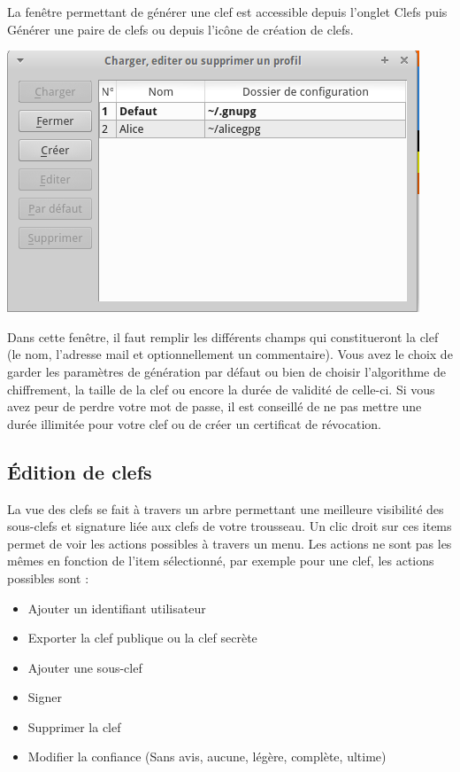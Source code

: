 \documentclass[a4paper,11pt,french]{article}
\begin{document}
La fenêtre permettant de générer une clef est accessible depuis l'onglet Clefs puis Générer une paire de clefs ou depuis l'icône de création de clefs.
\bigbreak

\includegraphics[scale=0.5]{creation.png} \bigbreak


Dans cette fenêtre, il faut remplir les différents champs qui constitueront la clef (le nom, l'adresse mail et optionnellement un commentaire). 
Vous avez le choix de garder les paramètres de génération par défaut ou bien de choisir l'algorithme de chiffrement, la taille de la clef ou encore
la durée de validité de celle-ci. Si vous avez peur de perdre votre mot de passe, il est conseillé de ne pas mettre une durée illimitée pour votre clef
ou de créer un certificat de révocation.


\subsection{Édition de clefs}

La vue des clefs se fait à travers un arbre permettant une meilleure visibilité des sous-clefs et signature liée aux clefs de votre trousseau. Un clic droit sur ces items permet de voir les actions possibles à travers un menu. Les actions ne sont pas les mêmes en fonction de l'item sélectionné, par exemple pour une clef, les actions possibles sont :

\begin{itemize}
\item Ajouter un identifiant utilisateur
\item Exporter la clef publique ou la clef secrète
\item Ajouter une sous-clef
\item Signer
\item Supprimer la clef
\item Modifier la confiance (Sans avis, aucune, légère, complète, ultime)
\end{itemize}
\end{document}
